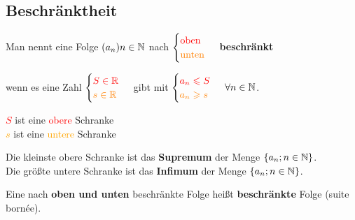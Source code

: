 \documentclass[main.tex]{subfiles}
\begin{document}
	\subsection{Beschränktheit}

\begin{Definition}
Man nennt eine Folge $(a_n)n \in \N$ nach
$\begin{cases}
	\text{\textcolor{red}{oben}} \\
	\text{\textcolor{orange}{unten}}
\end{cases}$
\textbf{beschränkt}

wenn es eine Zahl
$\begin{cases}
	\textcolor{red}{S \in \R} \\
	\textcolor{orange}{s \in \R}
\end{cases}$
gibt mit
$\begin{cases}
	\textcolor{red}{a_n \leq S} \\
	\textcolor{orange}{a_n \geq s}
\end{cases}$
$\forall n \in \N$.

\textcolor{red}{$S$} ist eine \textcolor{red}{obere }Schranke\\
\textcolor{orange}{$s$} ist eine \textcolor{orange}{untere} Schranke
\end{Definition}

\begin{Definition}
Die kleinste obere Schranke ist das \textbf{Supremum} der Menge $\{ a_n ; n \in \N \}$.\\
Die größte untere Schranke ist das \textbf{Infimum} der Menge $\{a_n;n \in \N \}$.
\end{Definition}


\begin{Definition}
Eine nach \textbf{oben und unten} beschränkte Folge heißt \textbf{beschränkte} Folge (suite bornée).
\end{Definition}
\end{document}

